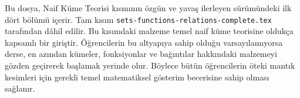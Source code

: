
\begin{editorial}
  Bu dosya, Naif Küme Teorisi kısmının özgün ve yavaş ilerleyen sürümündeki
  ilk dört bölümü içerir. Tam kısım
  \verb|sets-functions-relations-complete.tex| tarafından dâhil edilir.
  Bu kısımdaki malzeme temel naif küme teorisine oldukça kapsamlı bir
  giriştir. Öğrencilerin bu altyapıya sahip olduğu varsayılamıyorsa derse,
  en azından kümeler, fonksiyonlar ve bağıntılar hakkındaki malzemeyi gözden
  geçirerek başlamak yerinde olur. Böylece bütün öğrencilerin öteki mantık
  kesimleri için gerekli temel matematiksel gösterim becerisine sahip olması
  sağlanır.
\end{editorial}
\OLEndPartHook

